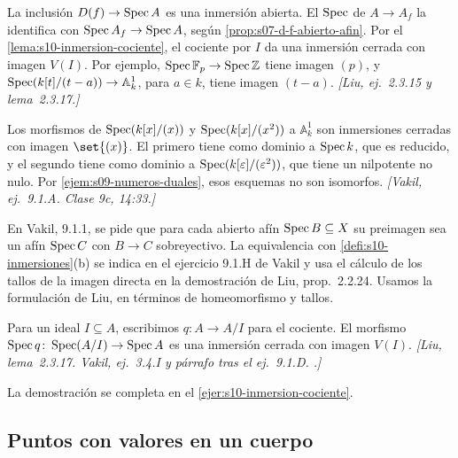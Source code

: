 \begin{ejem}
\label{ejem:s10-inmersiones-afines}
La inclusión \(D(f)\to\operatorname{Spec} A\) es una inmersión abierta. El \(\operatorname{Spec}\) de \(A\to A_f\) la identifica con \(\operatorname{Spec} A_f\to\operatorname{Spec} A\), según \cref{prop:s07-d-f-abierto-afin}. Por el \cref{lema:s10-inmersion-cociente}, el cociente por \(I\) da una inmersión cerrada con imagen \(V(I)\). Por ejemplo, \(\operatorname{Spec}\mathbb F_p\to\operatorname{Spec}\mathbb Z\) tiene imagen \((p)\), y \(\operatorname{Spec}(k[t]/(t-a))\to\mathbb A^1_k\), para \(a\in k\), tiene imagen \((t-a)\). \emph{[Liu, ej.~2.3.15 y lema~2.3.17.]}
\end{ejem}

\begin{obs}
\label{obs:s10-misma-imagen-cerrada}
Los morfismos de \(\operatorname{Spec}(k[x]/(x))\) y \(\operatorname{Spec}(k[x]/(x^2))\) a \(\mathbb A^1_k\) son inmersiones cerradas con imagen \(\set{(x)}\). El primero tiene como dominio a \(\operatorname{Spec} k\), que es reducido, y el segundo tiene como dominio a \(\operatorname{Spec}(k[\varepsilon]/(\varepsilon^2))\), que tiene un nilpotente no nulo. Por \cref{ejem:s09-numeros-duales}, esos esquemas no son isomorfos. \emph{[Vakil, ej.~9.1.A. Clase 9c, 14:33.]}
\end{obs}

\begin{obs}
\label{obs:s10-definicion-vakil}
En Vakil, 9.1.1, se pide que para cada abierto afín \(\operatorname{Spec} B\subseteq X\) su preimagen sea un afín \(\operatorname{Spec} C\) con \(B\to C\) sobreyectivo. La equivalencia con \cref{defi:s10-inmersiones}(b) se indica en el ejercicio 9.1.H de Vakil y usa el cálculo de los tallos de la imagen directa en la demostración de Liu, prop.~2.2.24. Usamos la formulación de Liu, en términos de homeomorfismo y tallos.
\end{obs}

\begin{lema}
\label{lema:s10-inmersion-cociente}
Para un ideal \(I\subseteq A\), escribimos \(q\colon A\to A/I\) para el cociente. El morfismo \(\operatorname{Spec} q\colon\operatorname{Spec}(A/I)\to\operatorname{Spec} A\) es una inmersión cerrada con imagen \(V(I)\). \emph{[Liu, lema~2.3.17. Vakil, ej.~3.4.I y párrafo tras el ej.~9.1.D. .]}
\end{lema}
La demostración se completa en el \cref{ejer:s10-inmersion-cociente}.

\subsection{Puntos con valores en un cuerpo}

